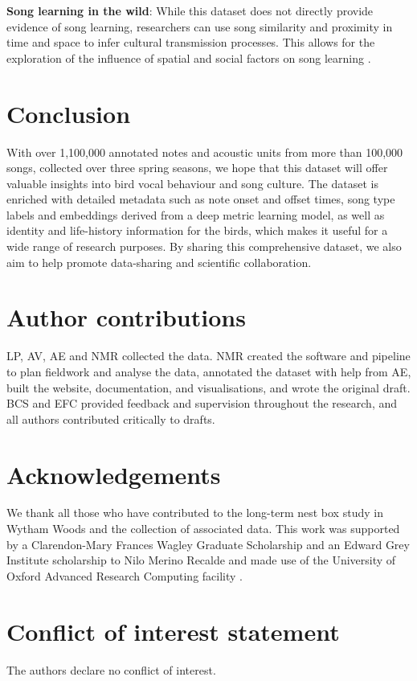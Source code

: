\textbf{Song learning in the wild}: While this dataset does not directly provide evidence of song learning, researchers can use song similarity and proximity in time and space to infer cultural transmission processes. This allows for the exploration of the influence of spatial and social factors on song learning \parencite{james2020, lachlan2003, nelson2014, peters2017, wheelwright2008}.


\section{Conclusion}

With over 1,100,000 annotated notes and acoustic units from more than 100,000 songs, collected over three spring seasons, we hope that this dataset will offer valuable insights into bird vocal behaviour and song culture. The dataset is enriched with detailed metadata such as note onset and offset times, song type labels and embeddings derived from a deep metric learning model, as well as identity and life-history information for the birds, which makes it useful for a wide range of research purposes. By sharing this comprehensive dataset, we also aim to help promote data-sharing and scientific collaboration.

\section{Author contributions}

LP, AV, AE and NMR collected the data. NMR created the software and pipeline to plan fieldwork and analyse the data, annotated the dataset with help from AE, built the website, documentation, and visualisations, and wrote the original draft. BCS and EFC provided feedback and supervision throughout the research, and all authors contributed critically to drafts.

\section{Acknowledgements}
We thank all those who have contributed to the long-term nest box study in Wytham Woods and the collection of associated data.
This work was supported by a Clarendon-Mary Frances Wagley Graduate Scholarship
and an Edward Grey Institute scholarship to Nilo Merino Recalde and made use of the University of Oxford Advanced Research Computing facility \parencite{richards2015}.

\section{Conflict of interest statement}
The authors declare no conflict of interest.

